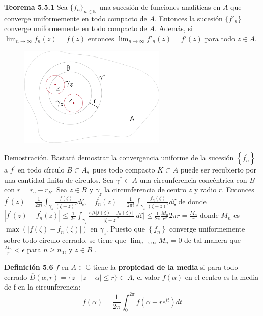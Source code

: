 \documentclass[a4paper, 11pt]{extarticle}
\newcommand{\tma}[1]{\textcolor{rojo}{\textbf{Teorema #1}}}
\newcommand{\defi}[1]{\textcolor{azul}{\textbf{Definición #1}}}
\newcommand{\dem}[1]{\textcolor{gris}{\small{Demostración. #1}}}
\begin{document}
\begin{multicols*}{2}
\tma{5.5.1} Sea \(\{ f_n \}_{n \in \mathbb{N}}\) una sucesión de funciones 
analíticas en \(A\) que converge uniformemente en todo compacto de \(A\).
Entonces la sucesión \(\{ f'_n \}\) converge uniformemente en todo compacto
de \(A\). Además, si \(\lim_{n \to \infty} f_n(z) = f(z)\) entonces \(\lim_{n \to \infty} f'_n(z) = f'(z)\) para todo \(z \in A\).

\begin{figure}[H]
\centering
\includegraphics[width=7cm]{imagenes/T-5_5_1.png}
\end{figure}

\dem{   Bastará demostrar la convergencia uniforme de la sucesión
$\left\{f_{n}^{\prime}\right\}$ a $f^{\prime}$ en todo círculo $B \subset A,$ pues todo compacto
 $K \subset A$ puede ser recubierto por una cantidad finita de círculos.
Sea $\gamma^{*} \subset A$ una circunferencia concéntrica con $B$ con $r = r_\gamma - r_B$.
 Sea $z \in B$ y $\gamma_{z}$ la circunferencia de centro $z$ y 
radio $r$. Entonces
$
f^{\prime}(z)=\frac{1}{2 \pi i} \int_{\gamma_{z}} \frac{f(\zeta)}{(\zeta-z)^{2}} d \zeta, \quad f_{n}^{\prime}(z)
=\frac{1}{2 \pi i} \int_{\gamma_{z}} \frac{f_{n}(\zeta)}{(\zeta-z)^{2}} d \zeta
$
de donde
$
|f^{\prime}(z)-f_{n}^{\prime}(z)|  \leq \frac{1}{2 \pi} \int_{\gamma_{z}} 
\frac{eft|f(\zeta)-f_{n}(\zeta)|}{|\zeta-z|^{2}}|d \zeta|
 \leq \frac{1}{2 \pi} \frac{M_{n}}{r^{2}} 2 \pi r=\frac{M_{n}}{r}
$
donde $M_{n}$ es $\max(\left|f(\zeta)-f_{n}(\zeta)\right|)$
en $\gamma_z$.
Puesto que $\left\{f_{n}\right\}$ converge uniformemente sobre todo círculo 
cerrado, se tiene que
$
\lim _{n \rightarrow \infty} M_{n}=0
$ de tal manera que $\frac{M_{n}}{r}<\epsilon$
para $n \geq n_{0}$, y $z \in B$ .
}

\defi{5.6} \(f\) en \(A \subset \mathbb{C}\) tiene la \textbf{propiedad de la media}
si para todo cerrado \(\overline{D}(\alpha, r) = \{ z \;|\; |z - \alpha| \le r
\} \subset A\), el valor \(f(\alpha)\) en el centro es la media de f en la
circunferencia:
\[ f(\alpha) = \frac{1}{2 \pi} \int_{0}^{2 \pi} f\left(\alpha+r e^{i t}\right) d t \]


\end{multicols*}
\end{document}
